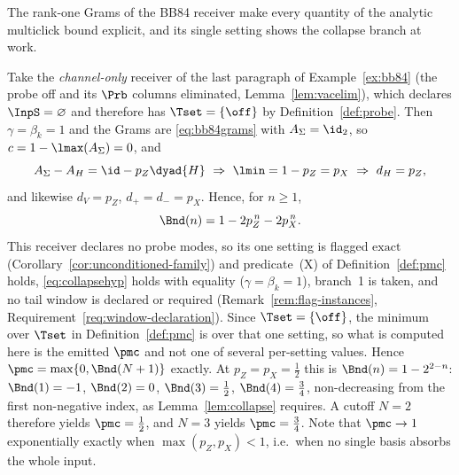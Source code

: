 
The rank-one Grams of the BB84 receiver make every quantity of the analytic
multiclick bound explicit, and its single setting shows the collapse branch at
work.

\begin{example}\label{ex:bb84bound}
Take the \emph{channel-only} receiver of the last paragraph of
Example~\ref{ex:bb84} (the probe off and its $\Prb$ columns eliminated,
Lemma~\ref{lem:vacelim}), which declares $\InpS=\varnothing$ and therefore
has $\Tset=\{\off\}$ by Definition~\ref{def:probe}. Then $\gamma=\beta_k=1$
and the Grams are \eqref{eq:bb84grams} with $A_\Sigma=\id_2$, so
$c=1-\lmax(A_\Sigma)=0$, and
\begin{equation}
  A_\Sigma-A_H=\id-p_Z\dyad{H}\ \Rightarrow\ \lmin=1-p_Z=p_X\ \Rightarrow\
  d_H=p_Z,
\end{equation}
and likewise $d_V=p_Z$, $d_+=d_-=p_X$. Hence, for $n\ge1$,
\begin{equation}\label{eq:bb84beta}
  \Bnd(n)=1-2p_Z^{\,n}-2p_X^{\,n}.
\end{equation}
This receiver declares no probe modes, so its one setting is flagged
$\mathrm{exact}$ (Corollary~\ref{cor:unconditioned-family}) and predicate~(X)
of Definition~\ref{def:pmc} holds, \eqref{eq:collapsehyp}
holds with equality ($\gamma=\beta_k=1$), branch~1 is taken, and no tail
window is declared or required (Remark~\ref{rem:flag-instances},
Requirement~\ref{req:window-declaration}). Since $\Tset=\{\off\}$, the minimum over
$\Tset$ in Definition~\ref{def:pmc} is over that one setting, so what is
computed here is the emitted $\pmc$ and not one of several per-setting values.
Hence $\pmc=\max\{0,\Bnd(N+1)\}$ exactly. At $p_Z=p_X=\tfrac12$ this is
$\Bnd(n)=1-2^{2-n}$: $\Bnd(1)=-1$, $\Bnd(2)=0$, $\Bnd(3)=\tfrac12$,
$\Bnd(4)=\tfrac34$, non-decreasing from the first non-negative index, as
Lemma~\ref{lem:collapse} requires. A cutoff $N=2$ therefore yields
$\pmc=\tfrac12$, and $N=3$ yields $\pmc=\tfrac34$. Note that $\pmc\to1$
exponentially exactly when $\max(p_Z,p_X)<1$, i.e.\ when no single basis
absorbs the whole input.
\end{example}
